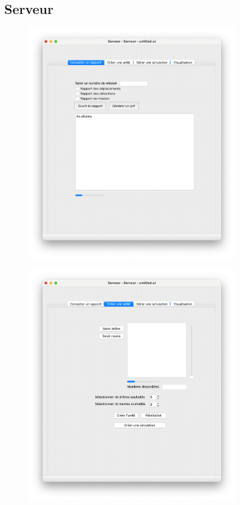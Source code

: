 \documentclass[12pt,a4paper]{scrartcl}
\theoremstyle{plain}
\theoremstyle{definition}
\theoremstyle{remark}
\begin{document}
	\subsection{Serveur}
		\begin{figure}[H]
		\centering
		\includegraphics[height=10cm]{img/maquette/serveur/1.png} 
	\end{figure}
		\begin{figure}[H]
		\centering
		\includegraphics[height=10cm]{img/maquette/serveur/2.png} 
	\end{figure}
\end{document}
